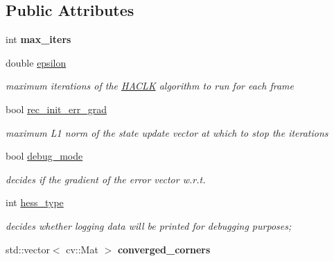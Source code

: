 \subsection*{Public Attributes}
\begin{DoxyCompactItemize}
\item 
\hypertarget{structHACLKParams_a579e0e9dbe1c2c3c28b26ef5a16464ce}{int {\bfseries max\-\_\-iters}}\label{structHACLKParams_a579e0e9dbe1c2c3c28b26ef5a16464ce}

\item 
\hypertarget{structHACLKParams_a06bb5fb4862d6d81a97ad9432afa0e70}{double \hyperlink{structHACLKParams_a06bb5fb4862d6d81a97ad9432afa0e70}{epsilon}}\label{structHACLKParams_a06bb5fb4862d6d81a97ad9432afa0e70}

\begin{DoxyCompactList}\small\item\em maximum iterations of the \hyperlink{classHACLK}{H\-A\-C\-L\-K} algorithm to run for each frame \end{DoxyCompactList}\item 
\hypertarget{structHACLKParams_a18e6aab09bf131d48b5c7ee013fe26f0}{bool \hyperlink{structHACLKParams_a18e6aab09bf131d48b5c7ee013fe26f0}{rec\-\_\-init\-\_\-err\-\_\-grad}}\label{structHACLKParams_a18e6aab09bf131d48b5c7ee013fe26f0}

\begin{DoxyCompactList}\small\item\em maximum L1 norm of the state update vector at which to stop the iterations \end{DoxyCompactList}\item 
bool \hyperlink{structHACLKParams_ae1b1aafcc9c2b966be957699c92f228a}{debug\-\_\-mode}
\begin{DoxyCompactList}\small\item\em decides if the gradient of the error vector w.\-r.\-t. \end{DoxyCompactList}\item 
int \hyperlink{structHACLKParams_a1acbdb628145c0aedddce3c6ea0f2c74}{hess\-\_\-type}
\begin{DoxyCompactList}\small\item\em decides whether logging data will be printed for debugging purposes; \end{DoxyCompactList}\item 
\hypertarget{structHACLKParams_ace5bdabe3beadcb59289773f8eb30da5}{std\-::vector$<$ cv\-::\-Mat $>$ {\bfseries converged\-\_\-corners}}\label{structHACLKParams_ace5bdabe3beadcb59289773f8eb30da5}

\end{DoxyCompactItemize}


